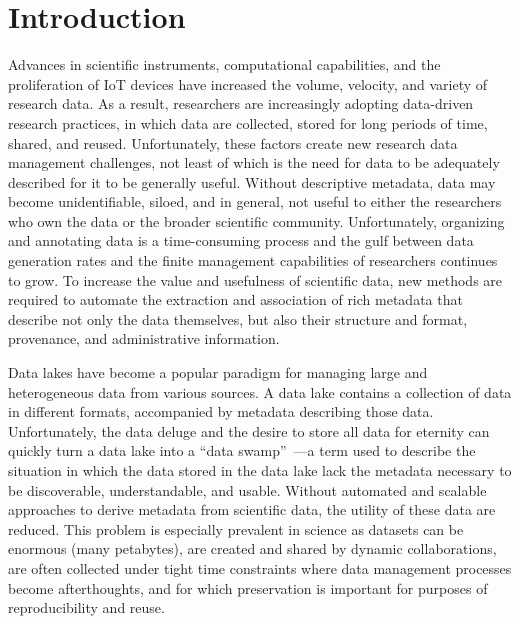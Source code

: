 \documentclass[sigconf]{acmart}
\begin{document}
\section{Introduction}


Advances in scientific instruments, computational capabilities, and the proliferation of IoT devices
have increased the volume, velocity, and variety of research data. 
As a result, researchers are increasingly adopting data-driven research practices, 
in which data are collected, stored for long periods of time, shared, 
and reused.
Unfortunately, these factors create new research data management challenges, 
not least of which is the need for data to be adequately described
for it to be generally useful. Without descriptive metadata, data
may become unidentifiable, siloed, and in general, 
not useful to either the researchers who own the data or the broader scientific community. 
Unfortunately, organizing and annotating data is a time-consuming process
and the gulf between data generation rates
and the finite management capabilities of researchers
continues to grow. To increase the value and usefulness of scientific data, 
new methods are required to automate the extraction and association 
of rich metadata that describe not only the data themselves, but
also their structure and format, provenance, and administrative information.

Data lakes have become a popular paradigm for managing large and 
heterogeneous data from various sources. 
A data lake contains a collection of data in different formats, 
accompanied by metadata describing those data. 
Unfortunately, the data deluge and the desire to store all data
for eternity can quickly turn a data lake into a ``data 
swamp''~\cite{skluzacek2018skluma}---a term used to describe the situation in which the data 
stored in the data lake lack the metadata necessary to be 
discoverable, understandable, and usable. Without automated and scalable 
approaches to derive metadata from scientific data, the utility of 
these data are reduced. This problem is 
especially prevalent in science as 
datasets can be enormous (many petabytes),
are created and shared by dynamic collaborations, 
are often collected under tight time constraints where data management processes become afterthoughts, 
and for which preservation is important for purposes of reproducibility and reuse. 
\end{document}
